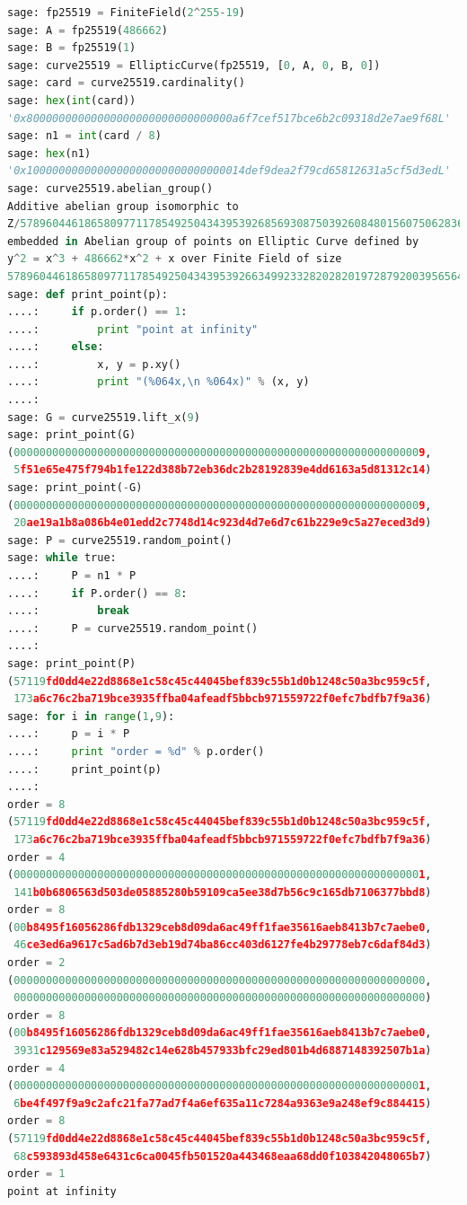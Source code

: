 \begin{lstlisting}[language=python, caption=Curve25519的Sage示例, label=lst-curve255619-sage]
sage: fp25519 = FiniteField(2^255-19)
sage: A = fp25519(486662)
sage: B = fp25519(1)
sage: curve25519 = EllipticCurve(fp25519, [0, A, 0, B, 0])
sage: card = curve25519.cardinality()
sage: hex(int(card))
'0x80000000000000000000000000000000a6f7cef517bce6b2c09318d2e7ae9f68L'
sage: n1 = int(card / 8)
sage: hex(n1)
'0x1000000000000000000000000000000014def9dea2f79cd65812631a5cf5d3edL'
sage: curve25519.abelian_group()
Additive abelian group isomorphic to 
Z/57896044618658097711785492504343953926856930875039260848015607506283634007912 
embedded in Abelian group of points on Elliptic Curve defined by 
y^2 = x^3 + 486662*x^2 + x over Finite Field of size 
57896044618658097711785492504343953926634992332820282019728792003956564819949
sage: def print_point(p):
....:     if p.order() == 1:
....:         print "point at infinity"
....:     else:
....:         x, y = p.xy()
....:         print "(%064x,\n %064x)" % (x, y)
....:
sage: G = curve25519.lift_x(9)
sage: print_point(G)
(0000000000000000000000000000000000000000000000000000000000000009,
 5f51e65e475f794b1fe122d388b72eb36dc2b28192839e4dd6163a5d81312c14)
sage: print_point(-G)
(0000000000000000000000000000000000000000000000000000000000000009,
 20ae19a1b8a086b4e01edd2c7748d14c923d4d7e6d7c61b229e9c5a27eced3d9)
sage: P = curve25519.random_point()
sage: while true:
....:     P = n1 * P
....:     if P.order() == 8:
....:         break
....:     P = curve25519.random_point()
....:
sage: print_point(P)
(57119fd0dd4e22d8868e1c58c45c44045bef839c55b1d0b1248c50a3bc959c5f,
 173a6c76c2ba719bce3935ffba04afeadf5bbcb971559722f0efc7bdfb7f9a36)
sage: for i in range(1,9):
....:     p = i * P
....:     print "order = %d" % p.order()
....:     print_point(p)
....:
order = 8
(57119fd0dd4e22d8868e1c58c45c44045bef839c55b1d0b1248c50a3bc959c5f,
 173a6c76c2ba719bce3935ffba04afeadf5bbcb971559722f0efc7bdfb7f9a36)
order = 4
(0000000000000000000000000000000000000000000000000000000000000001,
 141b0b6806563d503de05885280b59109ca5ee38d7b56c9c165db7106377bbd8)
order = 8
(00b8495f16056286fdb1329ceb8d09da6ac49ff1fae35616aeb8413b7c7aebe0,
 46ce3ed6a9617c5ad6b7d3eb19d74ba86cc403d6127fe4b29778eb7c6daf84d3)
order = 2
(0000000000000000000000000000000000000000000000000000000000000000,
 0000000000000000000000000000000000000000000000000000000000000000)
order = 8
(00b8495f16056286fdb1329ceb8d09da6ac49ff1fae35616aeb8413b7c7aebe0,
 3931c129569e83a529482c14e628b457933bfc29ed801b4d6887148392507b1a)
order = 4
(0000000000000000000000000000000000000000000000000000000000000001,
 6be4f497f9a9c2afc21fa77ad7f4a6ef635a11c7284a9363e9a248ef9c884415)
order = 8
(57119fd0dd4e22d8868e1c58c45c44045bef839c55b1d0b1248c50a3bc959c5f,
 68c593893d458e6431c6ca0045fb501520a443468eaa68dd0f103842048065b7)
order = 1
point at infinity
\end{lstlisting}

